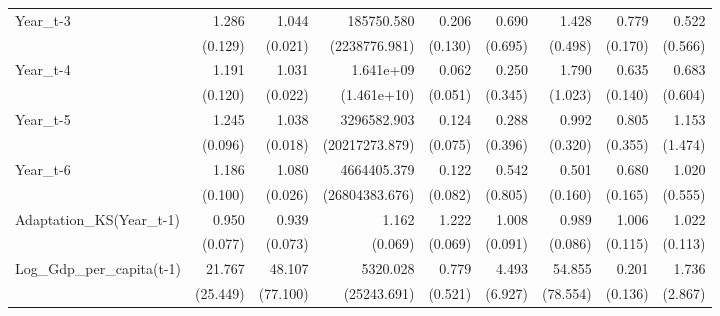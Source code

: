 \begin{table}[htbp]
\begin{tabular}{l*{8}{D{.}{.}{-1}}}
Year\_t-3    &       1.286\sym{**} &       1.044\sym{**} &  185750.580         &       0.206\sym{**} &       0.690         &       1.428         &       0.779         &       0.522         \\
            &     (0.129)         &     (0.021)         &(2238776.981)         &     (0.130)         &     (0.695)         &     (0.498)         &     (0.170)         &     (0.566)         \\
Year\_t-4    &       1.191\sym{*}  &       1.031\sym{\%}  &   1.641e+09\sym{**} &       0.062\sym{***}&       0.250         &       1.790         &       0.635\sym{**} &       0.683         \\
            &     (0.120)         &     (0.022)         & (1.461e+10)         &     (0.051)         &     (0.345)         &     (1.023)         &     (0.140)         &     (0.604)         \\
Year\_t-5    &       1.245\sym{***}&       1.038\sym{**} & 3296582.903\sym{**} &       0.124\sym{***}&       0.288         &       0.992         &       0.805         &       1.153         \\
            &     (0.096)         &     (0.018)         &(20217273.879)         &     (0.075)         &     (0.396)         &     (0.320)         &     (0.355)         &     (1.474)         \\
Year\_t-6    &       1.186\sym{**} &       1.080\sym{***}& 4664405.379\sym{***}&       0.122\sym{***}&       0.542         &       0.501\sym{**} &       0.680\sym{\%}  &       1.020         \\
            &     (0.100)         &     (0.026)         &(26804383.676)         &     (0.082)         &     (0.805)         &     (0.160)         &     (0.165)         &     (0.555)         \\
Adaptation\_KS(Year\_t-1)&       0.950         &       0.939         &       1.162\sym{**} &       1.222\sym{***}&       1.008         &       0.989         &       1.006         &       1.022         \\
            &     (0.077)         &     (0.073)         &     (0.069)         &     (0.069)         &     (0.091)         &     (0.086)         &     (0.115)         &     (0.113)         \\
Log\_Gdp\_per\_capita(t-1)&      21.767\sym{***}&      48.107\sym{**} &    5320.028\sym{*}  &       0.779         &       4.493         &      54.855\sym{***}&       0.201\sym{**} &       1.736         \\
            &    (25.449)         &    (77.100)         & (25243.691)         &     (0.521)         &     (6.927)         &    (78.554)         &     (0.136)         &     (2.867)         \\

\end{tabular}
\end{table}
